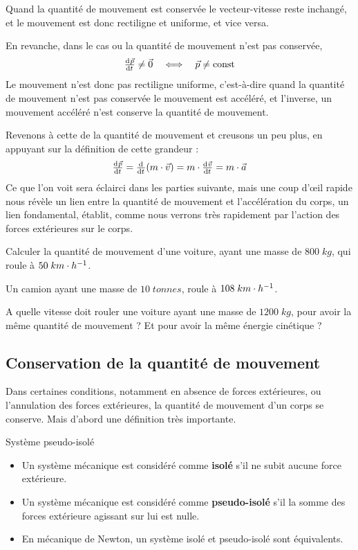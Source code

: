 \documentclass[11pt,a4paper]{article}
\begin{document}
Quand la quantité de mouvement est conservée le vecteur-vitesse reste inchangé, et le mouvement est donc rectiligne et uniforme, et vice versa. 

\endgroup

En revanche, dans le cas ou la quantité de mouvement n'est pas conservée, 
\[
\od{\vp}{t} \ne \Vec{0} \quad \Longleftrightarrow\quad \vp \ne \text{const}
\]
Le mouvement n'est donc pas rectiligne uniforme, c'est-à-dire quand la quantité de mouvement n'est pas conservée le mouvement est accéléré, et l'inverse, un mouvement accéléré n'est conserve la quantité de mouvement. 

Revenons à cette de la quantité de mouvement et creusons un peu plus, en appuyant sur la définition de cette grandeur : 
\[ \od{\vp}{t} = \od{}{t}(m\cdot\vv) = m\cdot\od{\vv}{t} = m\cdot\va \]
Ce que l'on voit sera éclairci dans les parties suivante, mais une coup d'\oe il rapide nous révèle un lien entre la quantité de mouvement et l'accélération du corps, un lien fondamental, établit, comme nous verrons très rapidement par l'action des forces extérieures sur le corps. 

\begin{exo}
Calculer la quantité de mouvement d’une voiture, ayant une masse de $800\; kg$, qui roule à $50\; km\cdot h^{-1}$. 
\vspace{2.5cm}
\end{exo}

\begin{exo}
Un camion ayant une masse de  $10\; tonnes$, roule à $108\; km\cdot h^{-1} $. 

A quelle vitesse doit rouler une voiture ayant une masse de $1200\; kg$, pour avoir la même quantité de mouvement ? Et pour avoir la même énergie cinétique ? 
\vspace{3cm}
\end{exo}

\subsection{Conservation de la quantité de mouvement}

Dans certaines conditions, notamment en absence de forces extérieures, ou l'annulation des forces extérieures, la quantité de mouvement d'un corps se conserve.  Mais d'abord une définition très importante.

\begin{defn}{Système pseudo-isolé}
\begin{itemize}
    \item Un système mécanique est considéré comme \textbf{isolé} s'il ne subit aucune force extérieure. 
    \item Un système mécanique est considéré comme \textbf{pseudo-isolé} s'il la somme des forces extérieure agissant sur lui est nulle. 
    \item En mécanique de Newton, un système isolé et pseudo-isolé sont équivalents. 
\end{itemize}
\end{defn}
\end{document}
